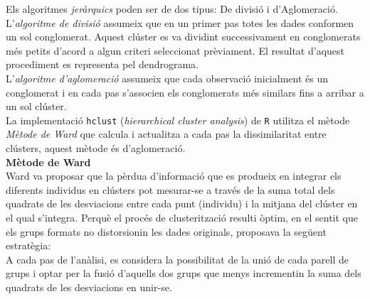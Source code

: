 \documentclass[english]{article}
\begin{document}
Els algoritmes \textit{jeràrquics} poden ser de dos tipus: De divisió i d'Aglomeració.
\\

L'\textit{algoritme de divisió} assumeix que en un primer pas totes les dades conformen un sol conglomerat. Aquest clúster es va dividint successivament en conglomerats més petits d'acord a algun criteri seleccionat prèviament. El resultat d'aquest procediment es representa pel dendrograma.
\\

L'\textit{algoritme d'aglomeració} assumeix que cada observació inicialment és un conglomerat i en cada pas s'associen els conglomerats més similars fins a arribar a un sol clúster.
\\

La implementació \texttt{hclust} (\textit{hierarchical cluster analysis}) de \texttt{R} utilitza el mètode  \textit{Mètode de Ward} que calcula i actualitza a cada pas la dissimilaritat entre clústers, aquest mètode és d'aglomeració.
\\
\clearpage
\noindent\textbf{Mètode de Ward}
\\

\noindent Ward va proposar que la pèrdua d'informació que es produeix en integrar els diferents individus en clústers pot mesurar-se a través de la suma total dels quadrats de les desviacions entre cada punt (individu) i la mitjana del clúster en el qual s'integra. Perquè el procés de clusterització resulti òptim, en el sentit que els grups formats no distorsionin les dades originals, proposava la següent estratègia:
\\

A cada pas de l'anàlisi, es considera la possibilitat de la unió de cada parell de grups i optar per la fusió d'aquells dos grups que menys incrementin la suma dels quadrats de les desviacions en unir-se.
\\
\end{document}
